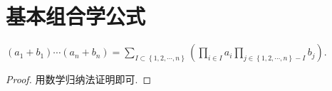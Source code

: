 \documentclass[../../main.tex]{subfiles}
\begin{document}
\section{基本组合学公式}

\begin{theorem}[二项式定理的推广]\label{theorem:二项式定理的推广}
$\left( a_1+b_1 \right)\cdots \left( a_n+b_n \right) =\sum_{I\subset \left\{ 1,2,\cdots ,n \right\}}{\left( \prod_{i\in I}{a_i}\prod_{j\in \left\{ 1,2,\cdots ,n \right\} -I}{b_j} \right)}.$
\end{theorem}
\begin{proof}
用数学归纳法证明即可.
\end{proof}
\end{document}
